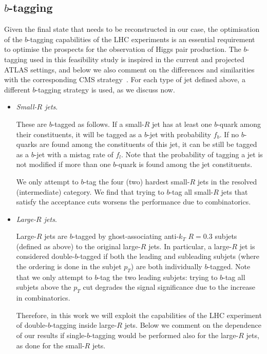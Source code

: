 \subsection{$b$-tagging}

Given the final state that needs to be reconstructed in our case, the
optimisation of the $b$-tagging capabilities of the
LHC experiments is an essential requirement to optimise
the prospects for the observation of Higgs pair production.
%
The $b$-tagging used in this feasibility study is inspired
in the current and projected ATLAS settings, and below
we also comment on the differences and similarities with the
corresponding CMS strategy~\cite{Khachatryan:2011wq,Chatrchyan:2012jua}.
%
For each type of jet defined above, a different
$b$-tagging strategy is used, as we discuss now.

\begin{itemize}

\item {\it Small-$R$ jets}.

  These are $b$-tagged as follows.
  If a small-$R$ jet has at least one $b$-quark among their constituents,
  it will be tagged as a $b$-jet with probability $f_b$.
  If no $b$-quarks are found among the constituents
  of this jet, it can be still be tagged as a $b$-jet with
  a mistag rate of $f_l$.
  Note that the probability of tagging a jet is not modified
  if more than one $b$-quark is found among the jet constituents.

  We only attempt to $b$-tag the four (two) hardest small-$R$ jets
  in the resolved (intermediate) category.
  We find that
  trying to $b$-tag all
  small-$R$ jets that satisfy the acceptance cuts worsens the performance
  due to combinatorics.

  \item {\it Large-$R$ jets}.

    Large-$R$ jets are $b$-tagged by ghost-associating anti-$k_T$ $R=0.3$
    subjets (defined as above) to the original large-$R$ jets.
    In particular,
    a large-$R$ jet is considered  double-$b$-tagged if both
    the leading and subleading subjets (where the ordering
    is done in the subjet $p_T$) are both individually $b$-tagged.
    Note that we only attempt to $b$-tag the two leading subjets:
    trying to $b$-tag all subjets above the $p_T$ cut degrades
    the signal significance due to the increase in combinatorics.

    Therefore, in this work we will exploit the capabilities of
    the LHC experiment of double-$b$-tagging inside large-$R$ jets.
    Below we comment on the dependence of our results if single-$b$-tagging
    would be performed also for the large-$R$ jets, as done
    for the small-$R$ jets.


\end{itemize}
